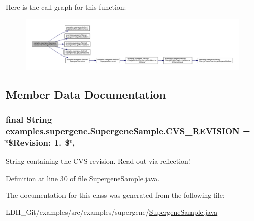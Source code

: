 Here is the call graph for this function\-:
\nopagebreak
\begin{figure}[H]
\begin{center}
\leavevmode
\includegraphics[width=350pt]{classexamples_1_1supergene_1_1_supergene_sample_a367571e3fe1b537e62559d15a817ac6d_cgraph}
\end{center}
\end{figure}




\subsection{Member Data Documentation}
\hypertarget{classexamples_1_1supergene_1_1_supergene_sample_af1f9312014229e3a141cc3a66aba975e}{
\subsubsection[{C\-V\-S\-\_\-\-R\-E\-V\-I\-S\-I\-O\-N}]{\setlength{\rightskip}{0pt plus 5cm}final String examples.\-supergene.\-Supergene\-Sample.\-C\-V\-S\-\_\-\-R\-E\-V\-I\-S\-I\-O\-N = \char`\"{}\$Revision\-: 1. \$\char`\"{}\hspace{0.3cm}{\ttfamily [static]}, {\ttfamily [private]}}}\label{classexamples_1_1supergene_1_1_supergene_sample_af1f9312014229e3a141cc3a66aba975e}
String containing the C\-V\-S revision. Read out via reflection! 

Definition at line 30 of file Supergene\-Sample.\-java.



The documentation for this class was generated from the following file\-:\begin{DoxyCompactItemize}
\item 
L\-D\-H\-\_\-\-Git/examples/src/examples/supergene/\hyperlink{_supergene_sample_8java}{Supergene\-Sample.\-java}\end{DoxyCompactItemize}
